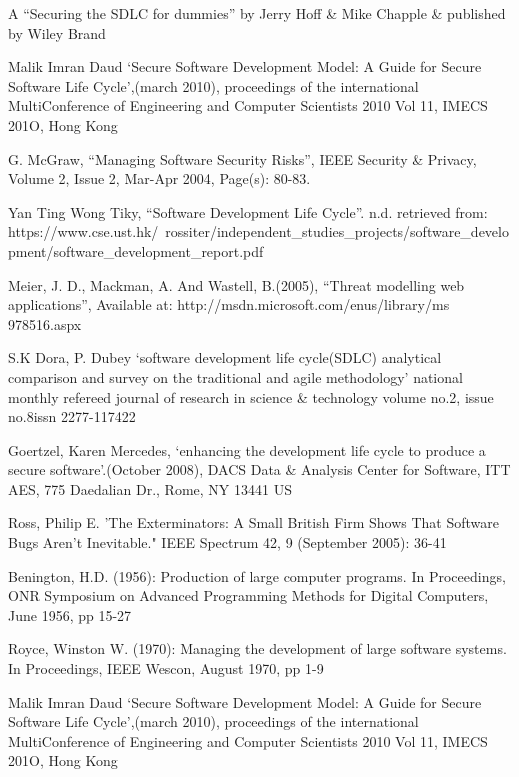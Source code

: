 \documentclass[12pt]{extreport}
\begin{document}
\newpage
\begin{thebibliography}{10}

A “Securing the SDLC for dummies” by Jerry Hoff \& Mike Chapple \& published by Wiley Brand

Malik Imran Daud ‘Secure Software Development Model: A Guide for Secure Software Life Cycle’,(march 2010), proceedings of the international MultiConference of Engineering and Computer Scientists 2010 Vol 11, IMECS 201O, Hong Kong

G. McGraw, “Managing Software Security Risks”, IEEE Security \& Privacy, Volume 2,
Issue 2, Mar-Apr 2004, Page(s): 80-83.


Yan Ting Wong Tiky, “Software Development Life Cycle”. n.d. retrieved from: https://www.cse.ust.hk/~rossiter/independent\_studies\_projects/software\_development/software\_development\_report.pdf

Meier, J. D., Mackman, A. And Wastell, B.(2005), “Threat modelling web applications”, Available at: http://msdn.microsoft.com/enus/library/ms 978516.aspx

S.K Dora, P. Dubey ‘software development life cycle(SDLC) analytical comparison and survey on the traditional and agile methodology’ national monthly refereed journal of research in science \& technology volume no.2, issue no.8issn 2277-117422

Goertzel, Karen Mercedes, ‘enhancing the development life cycle to produce a secure software’.(October 2008), DACS Data \& Analysis Center for Software, ITT AES, 775 Daedalian Dr., Rome, NY 13441
US


Ross, Philip E. 'The Exterminators: A Small British Firm Shows That Software Bugs Aren't Inevitable." IEEE Spectrum 42, 9 (September 2005): 36-41

Benington, H.D. (1956): Production of large computer programs. In Proceedings, ONR Symposium on Advanced Programming Methods for Digital Computers, June 1956, pp 15-27

Royce, Winston W. (1970): Managing the development of large software systems. In Proceedings, IEEE Wescon, August 1970, pp 1-9

Malik Imran Daud ‘Secure Software Development Model: A Guide for Secure Software Life Cycle’,(march 2010), proceedings of the international MultiConference of Engineering and Computer Scientists 2010 Vol 11, IMECS 201O, Hong Kong


\end{thebibliography}
\end{document}

